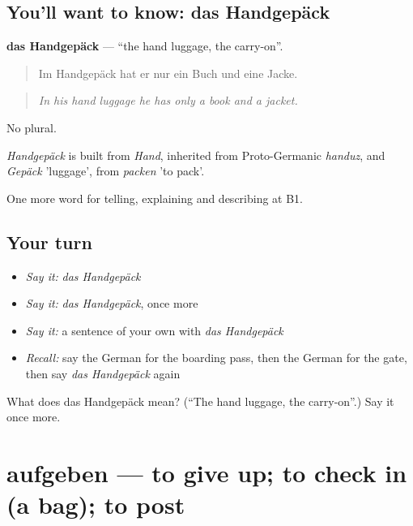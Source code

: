 \subsection*{You'll want to know: das Handgepäck}
\textbf{das Handgepäck} — \textquotedblleft{}the hand luggage, the carry-on\textquotedblright{}.

\begin{quote}
Im Handgepäck hat er nur ein Buch und eine Jacke.
\end{quote}

\begin{quote}
\emph{In his hand luggage he has only a book and a jacket.}
\end{quote}

No plural.

\begin{cousinweb}
\emph{Handgepäck} is built from \emph{Hand}, inherited from Proto-Germanic \emph{handuz}, and \emph{Gepäck} 'luggage', from \emph{packen} 'to pack'.
\end{cousinweb}

\begin{grammarlens}[title={What you've built}]
One more word for telling, explaining and describing at B1.
\end{grammarlens}

\subsection*{Your turn}
\begin{itemize}
\raggedright
  \item \emph{Say it:} \emph{das Handgepäck}
  \item \emph{Say it:} \emph{das Handgepäck}, once more
  \item \emph{Say it:} a sentence of your own with \emph{das Handgepäck}
  \item \emph{Recall:} say the German for the boarding pass, then the German for the gate, then say \emph{das Handgepäck} again
\end{itemize}

\begin{tcolorbox}[breakable,colback=teal!4,colframe=teal!35!black,title={Before you move on}]
What does das Handgepäck mean? (\textquotedblleft{}The hand luggage, the carry-on\textquotedblright{}.) Say it once more.
\end{tcolorbox}
\section[aufgeben]{aufgeben — to give up; to check in (a bag); to post}

